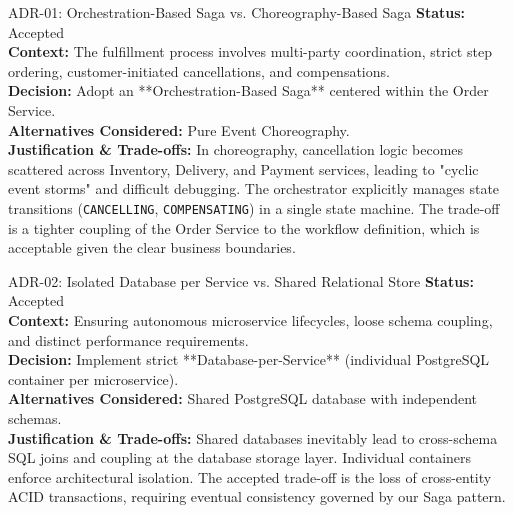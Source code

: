 \documentclass[11pt,a4paper]{article}
\begin{document}
\begin{adrbox}{ADR-01: Orchestration-Based Saga vs. Choreography-Based Saga}
\textbf{Status:} Accepted\\
\textbf{Context:} The fulfillment process involves multi-party coordination, strict step ordering, customer-initiated cancellations, and compensations.\\
\textbf{Decision:} Adopt an **Orchestration-Based Saga** centered within the Order Service.\\
\textbf{Alternatives Considered:} Pure Event Choreography.\\
\textbf{Justification \& Trade-offs:} In choreography, cancellation logic becomes scattered across Inventory, Delivery, and Payment services, leading to "cyclic event storms" and difficult debugging. The orchestrator explicitly manages state transitions (\texttt{CANCELLING}, \texttt{COMPENSATING}) in a single state machine. The trade-off is a tighter coupling of the Order Service to the workflow definition, which is acceptable given the clear business boundaries.
\end{adrbox}

\vspace{0.3cm}

\begin{adrbox}{ADR-02: Isolated Database per Service vs. Shared Relational Store}
\textbf{Status:} Accepted\\
\textbf{Context:} Ensuring autonomous microservice lifecycles, loose schema coupling, and distinct performance requirements.\\
\textbf{Decision:} Implement strict **Database-per-Service** (individual PostgreSQL container per microservice).\\
\textbf{Alternatives Considered:} Shared PostgreSQL database with independent schemas.\\
\textbf{Justification \& Trade-offs:} Shared databases inevitably lead to cross-schema SQL joins and coupling at the database storage layer. Individual containers enforce architectural isolation. The accepted trade-off is the loss of cross-entity ACID transactions, requiring eventual consistency governed by our Saga pattern.
\end{adrbox}

\vspace{0.3cm}
\end{document}
